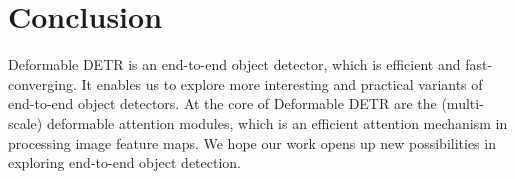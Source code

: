 \section{Conclusion}

Deformable DETR is an end-to-end object detector, which is efficient and fast-converging. It enables us to explore more interesting and practical variants of end-to-end object detectors. At the core of Deformable DETR are the (multi-scale) deformable attention modules, which is an efficient attention mechanism in processing image feature maps. We hope our work opens up new possibilities in exploring end-to-end object detection.


